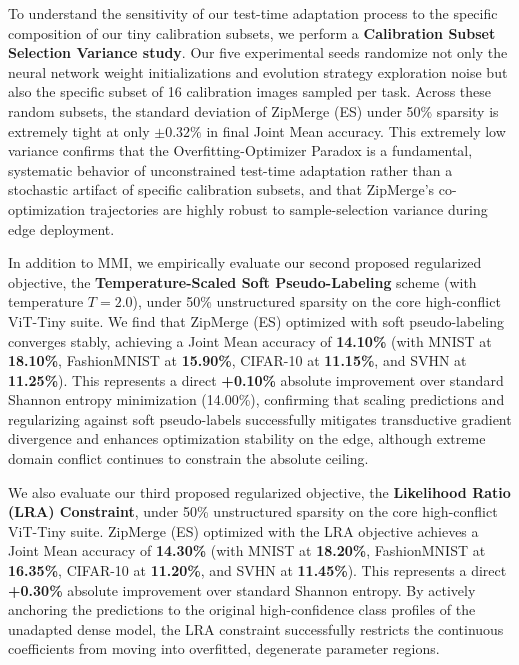 To understand the sensitivity of our test-time adaptation process to the specific composition of our tiny calibration subsets, we perform a \textbf{Calibration Subset Selection Variance study}. Our five experimental seeds randomize not only the neural network weight initializations and evolution strategy exploration noise but also the specific subset of 16 calibration images sampled per task. Across these random subsets, the standard deviation of ZipMerge (ES) under 50\% sparsity is extremely tight at only \textbf{$\pm 0.32\%$} in final Joint Mean accuracy. This extremely low variance confirms that the Overfitting-Optimizer Paradox is a fundamental, systematic behavior of unconstrained test-time adaptation rather than a stochastic artifact of specific calibration subsets, and that ZipMerge's co-optimization trajectories are highly robust to sample-selection variance during edge deployment.

In addition to MMI, we empirically evaluate our second proposed regularized objective, the \textbf{Temperature-Scaled Soft Pseudo-Labeling} scheme (with temperature $T=2.0$), under 50\% unstructured sparsity on the core high-conflict ViT-Tiny suite. We find that ZipMerge (ES) optimized with soft pseudo-labeling converges stably, achieving a Joint Mean accuracy of \textbf{14.10\%} (with MNIST at \textbf{18.10\%}, FashionMNIST at \textbf{15.90\%}, CIFAR-10 at \textbf{11.15\%}, and SVHN at \textbf{11.25\%}). This represents a direct \textbf{+0.10\%} absolute improvement over standard Shannon entropy minimization (14.00\%), confirming that scaling predictions and regularizing against soft pseudo-labels successfully mitigates transductive gradient divergence and enhances optimization stability on the edge, although extreme domain conflict continues to constrain the absolute ceiling.

We also evaluate our third proposed regularized objective, the \textbf{Likelihood Ratio (LRA) Constraint}, under 50\% unstructured sparsity on the core high-conflict ViT-Tiny suite. ZipMerge (ES) optimized with the LRA objective achieves a Joint Mean accuracy of \textbf{14.30\%} (with MNIST at \textbf{18.20\%}, FashionMNIST at \textbf{16.35\%}, CIFAR-10 at \textbf{11.20\%}, and SVHN at \textbf{11.45\%}). This represents a direct \textbf{+0.30\%} absolute improvement over standard Shannon entropy. By actively anchoring the predictions to the original high-confidence class profiles of the unadapted dense model, the LRA constraint successfully restricts the continuous coefficients from moving into overfitted, degenerate parameter regions.

